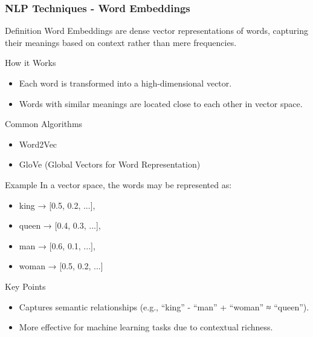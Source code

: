 \documentclass[aspectratio=169]{beamer}
\begin{document}
\begin{frame}[fragile]
  \frametitle{NLP Techniques - Word Embeddings}
  \begin{block}{Definition}
    Word Embeddings are dense vector representations of words, capturing their meanings based on context rather than mere frequencies.
  \end{block}

  \begin{block}{How it Works}
    \begin{itemize}
      \item Each word is transformed into a high-dimensional vector.
      \item Words with similar meanings are located close to each other in vector space.
    \end{itemize}
  \end{block}

  \begin{block}{Common Algorithms}
    \begin{itemize}
      \item Word2Vec
      \item GloVe (Global Vectors for Word Representation)
    \end{itemize}
  \end{block}

  \begin{block}{Example}
    In a vector space, the words may be represented as:
    \begin{itemize}
      \item king → [0.5, 0.2, ...],
      \item queen → [0.4, 0.3, ...],
      \item man → [0.6, 0.1, ...],
      \item woman → [0.5, 0.2, ...]
    \end{itemize}
  \end{block}

  \begin{block}{Key Points}
    \begin{itemize}
      \item Captures semantic relationships (e.g., ``king'' - ``man'' + ``woman'' ≈ ``queen'').
      \item More effective for machine learning tasks due to contextual richness.
    \end{itemize}
  \end{block}
\end{frame}
\end{document}
